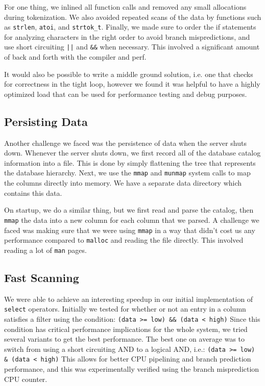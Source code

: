 \documentclass[a4paper, 12pt]{article}
\begin{document}
For one thing, we inlined all function calls and removed any small allocations during tokenization. We also avoided repeated scans of the data by functions such as \texttt{strlen}, \texttt{atoi}, and \texttt{strtok\_t}. Finally, we made sure to order the if statements for analyzing characters in the right order to avoid branch mispredictions, and use short circuiting \texttt{||} and \texttt{\&\&} when necessary. This involved a significant amount of back and forth with the compiler and perf.

\medskip
It would also be possible to write a middle ground solution, i.e. one that checks for correctness in the tight loop, however we found it was helpful to have a highly optimized load that can be used for performance testing and debug purposes.

\subsection{Persisting Data}

Another challenge we faced was the persistence of data when the server shuts down. Whenever the server shuts down, we first record all of the database catalog information into a file. This is done by simply flattening the tree that represents the database hierarchy. Next, we use the \texttt{mmap} and \texttt{munmap} system calls to map the columns directly into memory. We have a separate data directory which contains this data.

\medskip
On startup, we do a similar thing, but we first read and parse the catalog, then \texttt{mmap} the data into a new column for each column that we parsed. A challenge we faced was making sure that we were using \texttt{mmap} in a way that didn't cost us any performance compared to \texttt{malloc} and reading the file directly. This involved reading a lot of \texttt{man} pages.

\subsection{Fast Scanning}

We were able to achieve an interesting speedup in our initial implementation of \texttt{select} operators. Initially we tested for whether or not an entry in a column satisfies a filter using the condition: \texttt{(data >= low) \&\& (data < high)} Since this condition has critical performance implications for the whole system, we tried several variants to get the best performance. The best one on average was to switch from using a short circuiting AND to a logical AND, i.e.: \texttt{(data >= low) \& (data < high)} This allows for better CPU pipelining and branch prediction performance, and this was experimentally verified using the branch misprediction CPU counter. 
\end{document}

